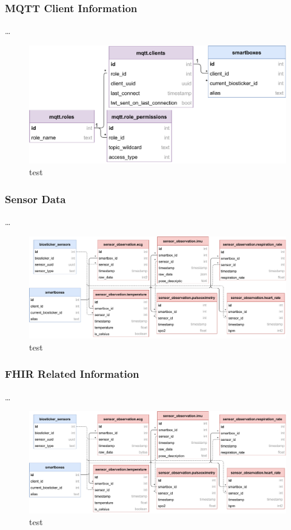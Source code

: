 \subsubsection{MQTT Client Information}
\dots 

\begin{figure}[H]
    \centering
    \includegraphics[width=\linewidth]{images/database-schema-mqtt.pdf}
    \caption[test]{test}
    \label{fig:wow-dbschema-mqtt}
\end{figure}

\subsubsection{Sensor Data}
\dots 

\begin{figure}[H]
    \centering
    \includegraphics[width=\linewidth]{images/database-schema-sensordata.pdf}
    \caption[test]{test}
    \label{fig:wow-dbschema-sensors}
\end{figure}

\subsubsection{FHIR Related Information}
\dots 

\begin{figure}[H]
    \centering
    \includegraphics[width=\linewidth]{images/database-schema-fhir.pdf}
    \caption[test]{test}
    \label{fig:wow-dbschema-fhir}
\end{figure}


